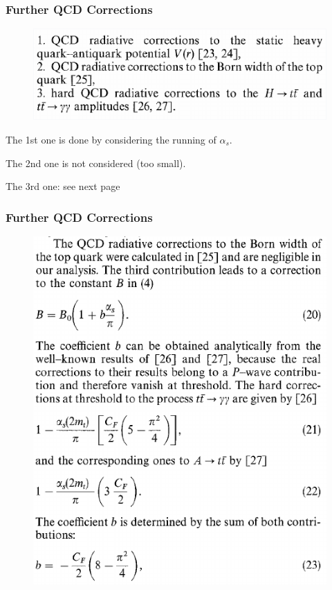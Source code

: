 \documentclass[8pt,dvipsnames,table]{beamer}
\begin{document}
\begin{frame}
	\frametitle{Further QCD Corrections}

	\begin{figure}[!htb]
		\centering
		\includegraphics[width=.8\linewidth]{image18.png}
		\label{fig:image18}
	\end{figure}
	The 1st one is done by considering the running of $\alpha_s$.

	The 2nd one is not considered (too small).

	The 3rd one: see next page

\end{frame}
\begin{frame}
	\frametitle{Further QCD Corrections}

	\begin{figure}[!htb]
		\centering
		\includegraphics[width=.65\linewidth]{image19.png}
		\label{fig:image19}
	\end{figure}


\end{frame}
\end{document}
